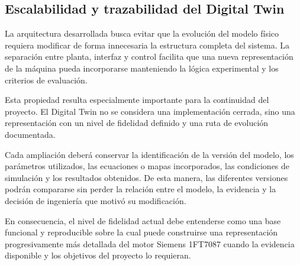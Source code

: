 \subsection{Escalabilidad y trazabilidad del Digital Twin}

La arquitectura desarrollada busca evitar que la evolución del modelo físico requiera modificar de forma innecesaria la estructura completa del sistema. La separación entre planta, interfaz y control facilita que una nueva representación de la máquina pueda incorporarse manteniendo la lógica experimental y los criterios de evaluación.

Esta propiedad resulta especialmente importante para la continuidad del proyecto. El Digital Twin no se considera una implementación cerrada, sino una representación con un nivel de fidelidad definido y una ruta de evolución documentada.

Cada ampliación deberá conservar la identificación de la versión del modelo, los parámetros utilizados, las ecuaciones o mapas incorporados, las condiciones de simulación y los resultados obtenidos. De esta manera, las diferentes versiones podrán compararse sin perder la relación entre el modelo, la evidencia y la decisión de ingeniería que motivó su modificación.

En consecuencia, el nivel de fidelidad actual debe entenderse como una base funcional y reproducible sobre la cual puede construirse una representación progresivamente más detallada del motor Siemens 1FT7087 cuando la evidencia disponible y los objetivos del proyecto lo requieran.

